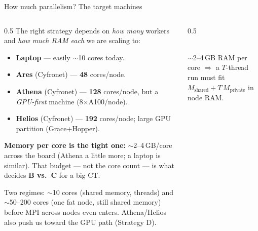 \documentclass[aspectratio=169,10pt]{beamer}
\begin{document}
\begin{frame}{How much parallelism? The target machines}
  \begin{columns}[T]
    \begin{column}{0.5\textwidth}
      \small
      The right strategy depends on \emph{how many} workers and \emph{how much
      RAM each} we are scaling to:
      \begin{itemize}\itemsep2pt
        \item \textbf{Laptop} — easily $\sim$10 cores today.
        \item \textbf{Ares} (Cyfronet) — \textbf{48} cores/node.
        \item \textbf{Athena} (Cyfronet) — \textbf{128} cores/node, but a
              \emph{GPU-first} machine (8$\times$A100/node).
        \item \textbf{Helios} (Cyfronet) — \textbf{192} cores/node; large
              GPU partition (Grace+Hopper).
      \end{itemize}
      \medskip
      \textbf{Memory per core is the tight one:} $\sim$2--4\,GB/core across the
      board (Athena a little more; a laptop is similar). That budget — not the
      core count — is what decides \textbf{B vs.\ C} for a big CT.
      \medskip

      \footnotesize\color{oshGrey}
      Two regimes: $\sim$10 cores (shared memory, threads) and $\sim$50--200
      cores (one fat node, still shared memory) before MPI across nodes even
      enters. Athena/Helios also push us toward the GPU path (Strategy D).
    \end{column}
    \begin{column}{0.5\textwidth}
      \centering
      \\[1mm]
      \footnotesize\color{oshGrey}
      $\sim$2--4\,GB RAM per core $\Rightarrow$ a $T$-thread run must fit
      $M_\text{shared}+T\,M_\text{private}$ in node RAM.
    \end{column}
  \end{columns}
\end{frame}
\end{document}
